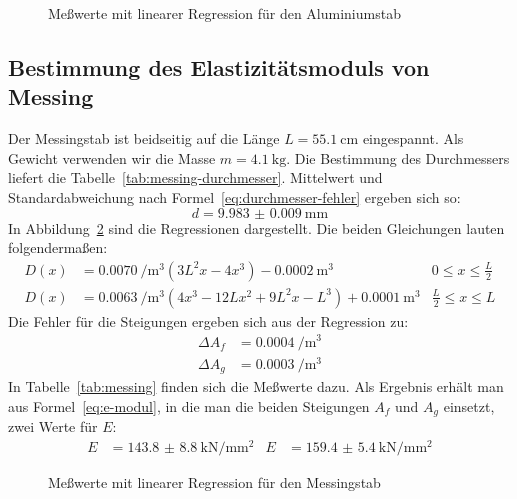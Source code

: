 \begin{figure}
  \centering
  \caption{Meßwerte mit linearer Regression für den Aluminiumstab}
  \label{fig:aluminium}
\end{figure}


\subsection{Bestimmung des Elastizitätsmoduls von Messing}

Der Messingstab ist beidseitig auf die Länge $L =
\SI{55.1}{\centi\metre}$ eingespannt. Als Gewicht verwenden wir die
Masse $m = \SI{4.1}{\kilogram}$. Die Bestimmung des Durchmessers liefert
die Tabelle~\ref{tab:messing-durchmesser}. Mittelwert und
Standardabweichung nach Formel~\eqref{eq:durchmesser-fehler} ergeben sich so:
%
\begin{equation}
  d = \SI{9.983(9)}{\milli\meter}
\end{equation}
%
In Abbildung~\ref{fig:messing} sind die Regressionen
dargestellt. Die beiden Gleichungen lauten folgendermaßen:
%
\begin{align}
  D(x) &= \SI{0.0070}{\per\cubic\metre} 
  ( 3L^2x-4x^3 ) - \SI{0.0002}{\cubic\metre} 
  & 0 \le x \le \frac{L}{2}\\
  D(x) &= \SI{0.0063}{\per\cubic\metre}
  (4x^3 - 12Lx^2 + 9L^2x - L^3) + \SI{0.0001}{\cubic\metre} 
  & \frac{L}{2} \le x \le L
\end{align}
%
Die Fehler für die Steigungen ergeben sich aus der Regression zu:
%
\begin{align}
  \Delta A_f &= \SI{0.0004}{\per\cubic\metre}\\
  \Delta A_g &= \SI{0.0003}{\per\cubic\metre}
\end{align}
%
In Tabelle~\ref{tab:messing} finden sich die Meßwerte dazu. Als
Ergebnis erhält man aus Formel~\eqref{eq:e-modul}, in die man die beiden
Steigungen $A_f$ und $A_g$ einsetzt, zwei Werte für $E$:
\begin{align}
 E&=\SI{143.8(88)}{\kilo\newton\per\milli\metre\squared} &
 E&=\SI{159.4(54)}{\kilo\newton\per\milli\metre\squared}
\end{align}

\begin{figure}
  \centering
  \caption{Meßwerte mit linearer Regression für den Messingstab}
  \label{fig:messing}
\end{figure}

